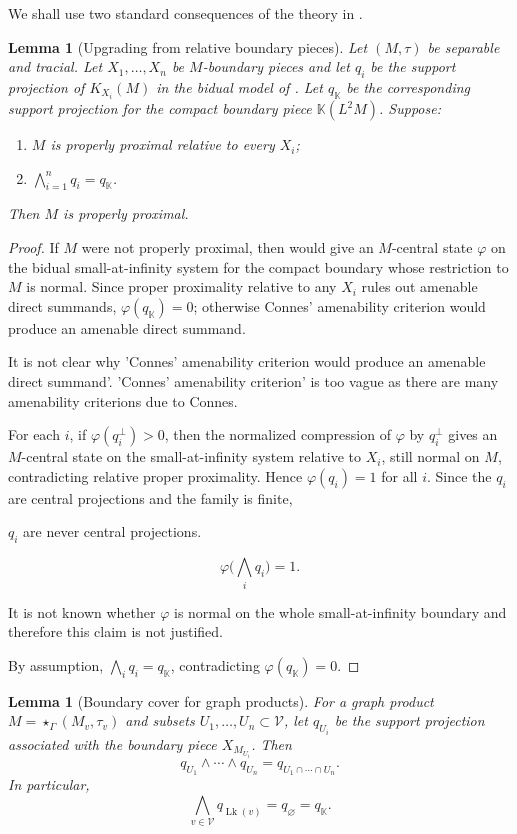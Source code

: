 \documentclass[12pt]{article}
\newtheorem{lemma}[theorem]{Lemma}
\theoremstyle{definition}
\newcommand{\V}{\mathcal V}
\newcommand{\Lk}{\operatorname{Lk}}
\newcommand{\K}{\mathbb K}
\newcommand{\review}[1]{\begin{reviewbox}#1\end{reviewbox}}
\begin{document}
We shall use two standard consequences of the theory in \cite{DKEP}.

\begin{lemma}[Upgrading from relative boundary pieces]\label{lem:upgrade}
Let $(M,\tau)$ be separable and tracial.  Let $X_1,\dots,X_n$ be $M$-boundary pieces and let $q_i$ be the support projection of $K_{X_i}(M)$ in the bidual model of \cite[Section 8]{DKEP}.  Let $q_{\K}$ be the corresponding support projection for the compact boundary piece $\K(L^2M)$.  Suppose:
\begin{enumerate}[label=(\roman*)]
\item $M$ is properly proximal relative to every $X_i$;
\item $\bigwedge_{i=1}^n q_i=q_{\K}$.
\end{enumerate}
Then $M$ is properly proximal.
\end{lemma}



\begin{proof}
If $M$ were not properly proximal, then \cite[Theorem 8.5]{DKEP} would give an $M$-central state $\varphi$ on the bidual small-at-infinity system for the compact boundary whose restriction to $M$ is normal.  Since proper proximality relative to any $X_i$ rules out amenable direct summands, $\varphi(q_{\K})=0$; otherwise Connes' amenability criterion would produce an amenable direct summand.

\review{It is not clear why 'Connes' amenability criterion would produce an amenable direct summand'. 'Connes' amenability criterion' is too vague as there are many amenability criterions due to Connes.}

For each $i$, if $\varphi(q_i^\perp)>0$, then the normalized compression of $\varphi$ by $q_i^\perp$ gives an $M$-central state on the small-at-infinity system relative to $X_i$, still normal on $M$, contradicting relative proper proximality.  Hence $\varphi(q_i)=1$ for all $i$.  Since the $q_i$ are central projections and the family is finite,
\review{$q_i$ are never central projections.}
\[
\varphi\Big(\bigwedge_i q_i\Big)=1.
\]
\review{It is not known whether $\varphi$ is normal on the whole small-at-infinity boundary and therefore this claim is not justified.}
By assumption, $\bigwedge_i q_i=q_{\K}$, contradicting $\varphi(q_{\K})=0$.
\end{proof}



\begin{lemma}[Boundary cover for graph products]\label{lem:boundary-cover}
For a graph product $M=\star_{\Gamma}(M_v,\tau_v)$ and subsets $U_1,\dots,U_n\subset \V$, let $q_{U_i}$ be the support projection associated with the boundary piece $X_{M_{U_i}}$.  Then
\[
q_{U_1}\wedge\cdots\wedge q_{U_n}=q_{U_1\cap\cdots\cap U_n}.
\]
In particular,
\[
\bigwedge_{v\in \V} q_{\Lk(v)}=q_\varnothing=q_{\K}.
\]
\end{lemma}
\end{document}
